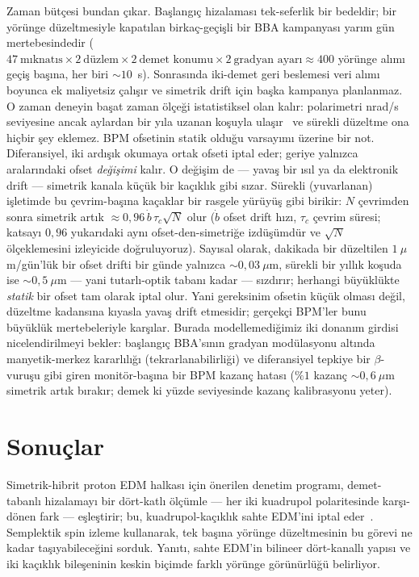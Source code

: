 \documentclass[aps,prab,reprint,superscriptaddress,nofootinbib]{revtex4-2}
\begin{document}
Zaman bütçesi bundan çıkar. Başlangıç hizalaması tek-seferlik bir bedeldir; bir
yörünge düzeltmesiyle kapatılan birkaç-geçişli bir BBA kampanyası yarım gün
mertebesindedir ($47~\text{mıknatıs}\times2~\text{düzlem}\times2~\text{demet konumu}
\times2~\text{gradyan ayarı}\approx400$ yörünge alımı geçiş başına, her biri
$\sim\!10$~s). Sonrasında iki-demet geri beslemesi veri alımı boyunca ek maliyetsiz
çalışır ve simetrik drift için başka kampanya planlanmaz. O zaman deneyin başat zaman
ölçeği istatistiksel olan kalır: polarimetri nrad/s seviyesine ancak aylardan bir
yıla uzanan koşuyla ulaşır~\cite{polarimeter} ve sürekli düzeltme ona hiçbir şey
eklemez. BPM ofsetinin statik olduğu varsayımı üzerine bir not. Diferansiyel, iki
ardışık okumaya ortak ofseti iptal eder; geriye yalnızca aralarındaki ofset
\emph{değişimi} kalır. O değişim de --- yavaş bir ısıl ya da elektronik drift ---
simetrik kanala küçük bir kaçıklık gibi sızar. Sürekli (yuvarlanan) işletimde bu
çevrim-başına kaçaklar bir rasgele yürüyüş gibi birikir: $N$ çevrimden sonra simetrik
artık $\approx 0{,}96\,\dot b\,\tau_c \sqrt{N}$ olur ($\dot b$ ofset drift hızı,
$\tau_c$ çevrim süresi; katsayı $0{,}96$ yukarıdaki aynı ofset-den-simetriğe
izdüşümdür ve $\sqrt{N}$ ölçeklemesini izleyicide doğruluyoruz). Sayısal olarak,
dakikada bir düzeltilen $1~\mu$m/gün'lük bir ofset drifti bir günde yalnızca
$\sim\!0{,}03~\mu$m, sürekli bir yıllık koşuda ise $\sim\!0{,}5~\mu$m --- yani
tutarlı-optik tabanı kadar --- sızdırır; herhangi büyüklükte \emph{statik} bir ofset
tam olarak iptal olur. Yani gereksinim ofsetin küçük olması değil, düzeltme kadansına
kıyasla yavaş drift etmesidir; gerçekçi BPM'ler bunu büyüklük mertebeleriyle karşılar.
Burada modellemediğimiz iki donanım girdisi nicelendirilmeyi bekler: başlangıç
BBA'sının gradyan modülasyonu altında manyetik-merkez kararlılığı
(tekrarlanabilirliği) ve diferansiyel tepkiye bir $\beta$-vuruşu gibi giren
monitör-başına bir BPM kazanç hatası ($\%1$ kazanç $\sim\!0{,}6~\mu$m simetrik artık
bırakır; demek ki yüzde seviyesinde kazanç kalibrasyonu yeter).


\section{Sonuçlar}
\label{sec:conclusions}

Simetrik-hibrit proton EDM halkası için önerilen denetim programı, demet-tabanlı
hizalamayı bir dört-katlı ölçümle --- her iki kuadrupol polaritesinde karşı-dönen
fark --- eşleştirir; bu, kuadrupol-kaçıklık sahte EDM'ini iptal eder~\cite{omarov}.
Semplektik spin izleme kullanarak, tek başına yörünge düzeltmesinin bu görevi ne
kadar taşıyabileceğini sorduk. Yanıtı, sahte EDM'in bilineer dört-kanallı yapısı ve
iki kaçıklık bileşeninin keskin biçimde farklı yörünge görünürlüğü belirliyor.
\end{document}
